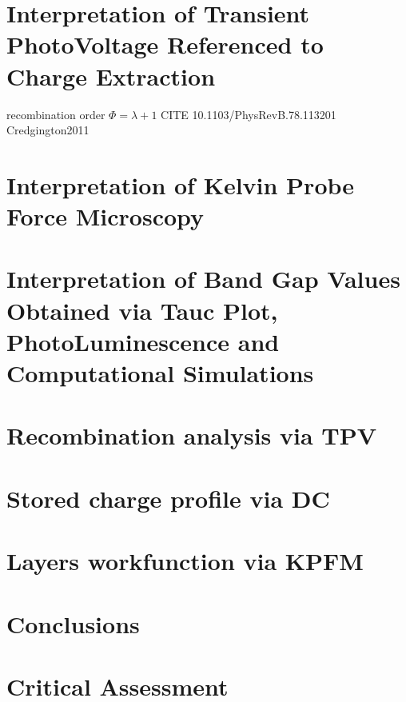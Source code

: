 \section{Interpretation of Transient PhotoVoltage Referenced to Charge Extraction}\label{interpretation_tpvce}

recombination order $\Phi = \lambda + 1$ CITE 10.1103/PhysRevB.78.113201 Credgington2011


\section{Interpretation of Kelvin Probe Force Microscopy}\label{interpretation_kpfm}

\section{Interpretation of Band Gap Values Obtained via Tauc Plot, PhotoLuminescence and Computational Simulations}\label{interpretation_bg}



\section{Recombination analysis via TPV}
\section{Stored charge profile via DC}
\section{Layers workfunction via KPFM}
\section{Conclusions}
\section{Critical Assessment}